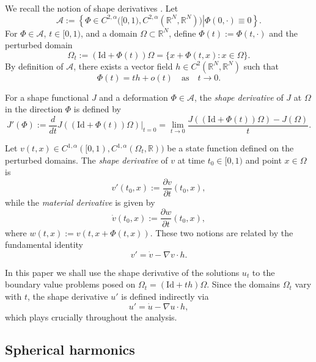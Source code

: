\documentclass[reqno]{amsart}
\numberwithin{equation}{section}
\numberwithin{equation}{section}
\numberwithin{equation}{section}
\begin{document}
We recall the notion of shape derivatives \cite{CavallinaY,HenrotP}. Let
\[
\mathcal{A} := \left\{\left. \Phi \in C^{2,\alpha}\bigl([0,1), C^{2,\alpha}(\mathbb{R}^N,\mathbb{R}^N)\bigr) \right| \Phi(0,\cdot) \equiv 0 \right\}.
\]
For \(\Phi \in \mathcal{A}\), \(t \in [0,1)\), and a domain \(\Omega \subset \mathbb{R}^N\), define \(\Phi(t) := \Phi(t,\cdot)\) and the perturbed domain
\[
\Omega_t := (\mathrm{Id} + \Phi(t))\Omega = \{ x + \Phi(t,x) : x \in \Omega \}.
\]
By definition of \(\mathcal{A}\), there exists a vector field \(h \in C^2(\mathbb{R}^N,\mathbb{R}^N)\) such that
$$
\Phi(t) = t h + o(t) \quad \text{as} \quad t \to 0.
$$

For a shape functional \(J\) and a deformation \(\Phi \in \mathcal{A}\), the \emph{shape derivative} of \(J\) at \(\Omega\) in the direction \(\Phi\) is defined by
\[
J'(\Phi) := \frac{d}{dt} J((\mathrm{Id} + \Phi(t))\Omega) \Big|_{t=0} = \lim_{t \to 0} \frac{J((\mathrm{Id} + \Phi(t))\Omega) - J(\Omega)}{t}.
\]

Let \(v(t,x) \in C^{1,\alpha}([0,1), C^{1,\alpha}(\Omega_t,\mathbb{R}))\) be a state function defined on the perturbed domains. The \emph{shape derivative} of \(v\) at time \(t_0 \in [0,1)\) and point \(x \in \Omega\) is
\[
v'(t_0,x) := \frac{\partial v}{\partial t}(t_0,x),
\]
while the \emph{material derivative} is given by
\[
\dot{v}(t_0,x) := \frac{\partial w}{\partial t}(t_0,x),
\]
where \(w(t,x) := v(t, x + \Phi(t,x))\). These two notions are related by the fundamental identity
$$
v' = \dot{v} - \nabla v \cdot h.
$$

In this paper we shall use the shape derivative of the solutions $u_t$ to the boundary value problems posed on $\Omega_t = (\mathrm{Id} + t h)\Omega$. Since the domains $\Omega_t$ vary with $t$, the shape derivative $u'$ is defined indirectly via
\begin{equation}\label{e2.3}
u' = \dot{u} - \nabla u \cdot h,
\end{equation}
which plays crucially throughout the analysis.


\subsection{Spherical harmonics}
\end{document}

